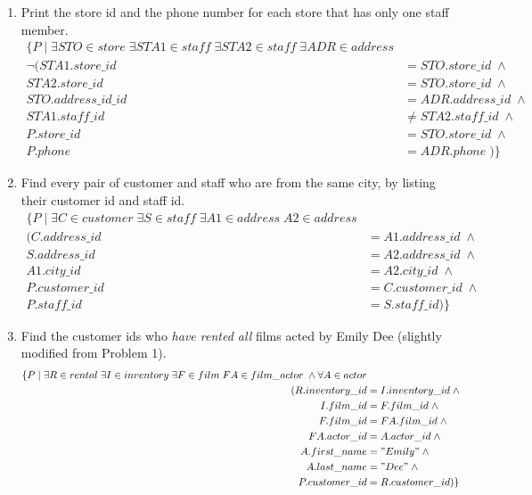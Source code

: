 \documentclass[paper=a4, fontsize=11pt]{scrartcl} %
\numberwithin{figure}{section} %
\numberwithin{table}{section} %
\begin{document}
\begin{enumerate}
\begin{enumerate}
\item Print the store id and the phone number for each store that has only one staff member.
\begin{equation*}
\begin{aligned}
 \{ P \; | \; \exists STO \in store \; \exists STA1 \in staff \; \exists STA2 \in staff \; \exists ADR \in address\\
 \neg(STA1.store\_id &= STO.store\_id \; \wedge \\
 STA2.store\_id &= STO.store\_id \; \wedge \\
 STO.address\_id\_id &= ADR.address\_id \; \wedge  \\
 STA1.staff\_id &\neq STA2.staff\_id \; \wedge \\
 P.store\_id &= STO.store\_id \; \wedge \\
P.phone &= ADR.phone \; )  \}
\end{aligned}
\end{equation*}

\item Find every pair of customer and staff who are from the same city, by listing their customer id and staff id.
\begin{equation*}
\begin{aligned}
\{ P \; | \; \exists C \in customer \; \exists S \in staff \; \exists A1 \in address \; A2 \in address\\
(C.address\_id &= A1.address\_id \; \wedge\\
 S.address\_id &= A2.address\_id \; \wedge\\
 A1.city\_id &= A2.city\_id \; \wedge\\
 P.customer\_id &= C.customer\_id \; \wedge\\
 P.staff\_id &= S.staff\_id )\}
\end{aligned}
\end{equation*}

\item Find the customer ids who \textit{have rented all} films acted by Emily Dee (slightly modified from Problem 1).
\begin{equation*}
\begin{aligned}
\{ P \; | \; \exists R \in rental \; \exists I \in inventory \; \exists F \in film \; FA \in film\_actor \; \wedge \forall A \in actor\\
(R.inventory\_id &= I.inventory\_id \; \wedge\\
 I.film\_id &= F.film\_id \; \wedge\\
 F.film\_id &= FA.film\_id \; \wedge\\
 FA.actor\_id &= A.actor\_id \; \wedge\\
 A.first\_name &= "Emily" \; \wedge\\
 A.last\_name &= "Dee" \; \wedge\\
 P.customer\_id &= R.customer\_id  )\}
\end{aligned}
\end{equation*}

\end{enumerate}

\end{enumerate}
\end{document}
